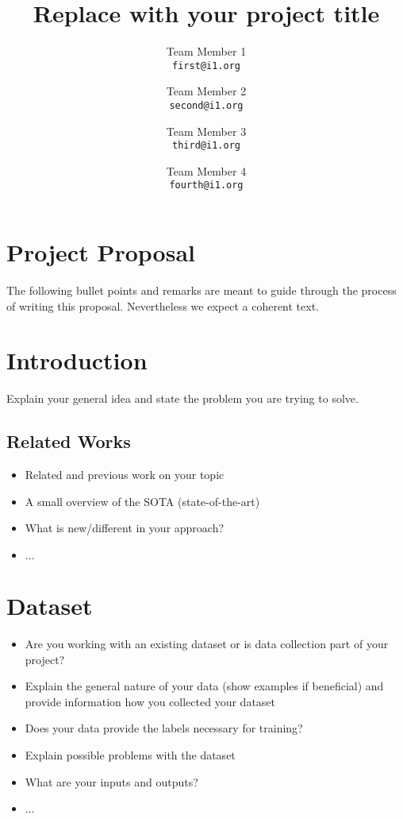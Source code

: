 \documentclass[10pt,twocolumn,letterpaper]{article}
\begin{document}
\title{Replace with your project title}

\author{Team Member 1\\
{\tt\small first@i1.org}
\and
Team Member 2\\
{\tt\small second@i1.org}
\and
Team Member 3\\
{\tt\small third@i1.org}
\and
Team Member 4\\
{\tt\small fourth@i1.org}
}


\maketitle

%
%
\section*{Project Proposal}
The following bullet points and remarks are meant to guide through the process of writing this proposal. Nevertheless we expect a coherent text.

\section{Introduction}
    Explain your general idea and state the problem you are trying to solve.

    \subsection{Related Works}
        \begin{itemize}
            \item Related and previous work on your topic
            \item A small overview of the SOTA (state-of-the-art)
            \item What is new/different in your approach?
            \item $\dots$
        \end{itemize}

\section{Dataset}
    \begin{itemize}
        \item Are you working with an existing dataset or is data collection part of your project?
        \item Explain the general nature of your data (show examples if beneficial) and provide information how you collected your dataset
        \item Does your data provide the labels necessary for training?
        \item Explain possible problems with the dataset
        \item What are your inputs and outputs?
        \item $\dots$
    \end{itemize}
\end{document}
